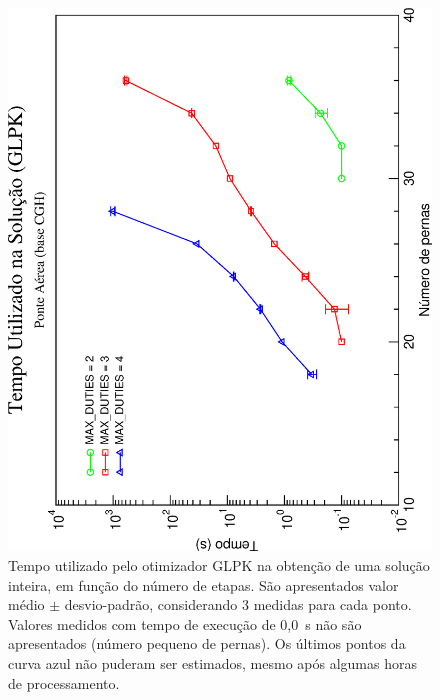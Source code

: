 \begin{figure}[htb]
	\begin{center}
		\includegraphics[scale=0.45,angle=-90]{fig/glpk_solution_time.eps}
		\caption{Tempo utilizado pelo otimizador GLPK na obtenção de uma solução inteira, em função do 
		número de etapas. São apresentados valor médio $\pm$ desvio-padrão, considerando 3 medidas para 
		cada ponto. Valores medidos com tempo de execução de 0,0~s não são apresentados (número pequeno 
		de pernas). Os últimos pontos da curva azul não puderam ser estimados, mesmo após algumas horas 
		de processamento.}
		\label{fig:glpk}
	\end{center}
\end{figure}

